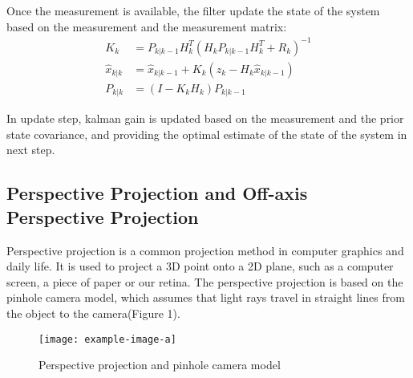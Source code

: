 Once the measurement is available, the filter update the state of the system based on the measurement and the measurement matrix:
\begin{equation}
    \begin{aligned}
        K_k &= P_{k|k-1} H_k^T (H_k P_{k|k-1} H_k^T + R_k)^{-1} \\
        \hat{x}_{k|k} &= \hat{x}_{k|k-1} + K_k(z_k - H_k \hat{x}_{k|k-1}) \\
        P_{k|k} &= (I - K_k H_k) P_{k|k-1} 
    \end{aligned}
\end{equation}

In update step, kalman gain is updated based on the measurement and the prior state covariance, and providing the optimal estimate of the state of the system in next step.

\subsection{Perspective Projection and Off-axis Perspective Projection}

Perspective projection is a common projection method in computer graphics and daily life. It is used to project a 3D point onto a 2D plane, such as a computer screen, a piece of paper or our retina. The perspective projection is based on the pinhole camera model, which assumes that light rays travel in straight lines from the object to the camera(Figure 1). 

\begin{figure}[htb]
    \centering
    \texttt{[image: example-image-a]}
    \caption{Perspective projection and pinhole camera model}\label{F:test-a}
\end{figure}

